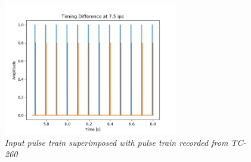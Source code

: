 \documentclass[twoside,a4paper]{article}
\begin{document}
\begin{figure}[ht]
    \center
    \includegraphics[width=3in]{../Simulations/TimingEffects/timing_diff_7-5.png}
    \caption{\label{timingSim}{\it Input pulse train superimposed with pulse train recorded from TC-260}}
\end{figure}
%
\end{document}
